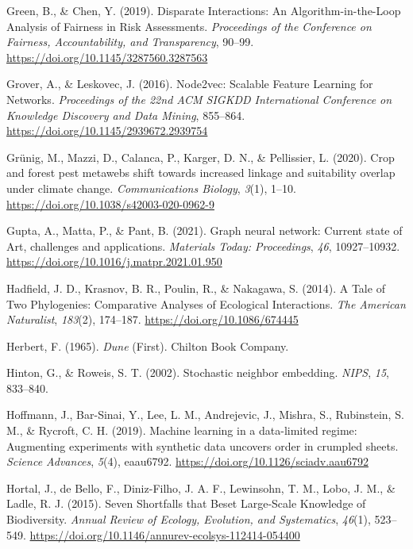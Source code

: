 \documentclass[10pt,oneside]{article}
\newlength{\cslhangindent}
\newenvironment{CSLReferences}[2] %
 {%
  \setlength{\parindent}{0pt}
  \ifodd #1 \everypar{\setlength{\hangindent}{\cslhangindent}}\ignorespaces\fi
  \ifnum #2 > 0
  \setlength{\parskip}{#2\baselineskip}
  \fi
 }%
 {}
\begin{document}
\begin{CSLReferences}{1}{0}
\leavevmode{}%
Green, B., \& Chen, Y. (2019). Disparate Interactions: An
Algorithm-in-the-Loop Analysis of Fairness in Risk Assessments.
\emph{Proceedings of the Conference on Fairness, Accountability, and
Transparency}, 90--99. \url{https://doi.org/10.1145/3287560.3287563}

\leavevmode{}%
Grover, A., \& Leskovec, J. (2016). Node2vec: Scalable Feature Learning
for Networks. \emph{Proceedings of the 22nd ACM SIGKDD International
Conference on Knowledge Discovery and Data Mining}, 855--864.
\url{https://doi.org/10.1145/2939672.2939754}

\leavevmode{}%
Grünig, M., Mazzi, D., Calanca, P., Karger, D. N., \& Pellissier, L.
(2020). Crop and forest pest metawebs shift towards increased linkage
and suitability overlap under climate change. \emph{Communications
Biology}, \emph{3}(1), 1--10.
\url{https://doi.org/10.1038/s42003-020-0962-9}

\leavevmode{}%
Gupta, A., Matta, P., \& Pant, B. (2021). Graph neural network: Current
state of Art, challenges and applications. \emph{Materials Today:
Proceedings}, \emph{46}, 10927--10932.
\url{https://doi.org/10.1016/j.matpr.2021.01.950}

\leavevmode{}%
Hadfield, J. D., Krasnov, B. R., Poulin, R., \& Nakagawa, S. (2014). A
Tale of Two Phylogenies: Comparative Analyses of Ecological
Interactions. \emph{The American Naturalist}, \emph{183}(2), 174--187.
\url{https://doi.org/10.1086/674445}

\leavevmode{}%
Herbert, F. (1965). \emph{Dune} (First). Chilton Book Company.

\leavevmode{}%
Hinton, G., \& Roweis, S. T. (2002). Stochastic neighbor embedding.
\emph{NIPS}, \emph{15}, 833--840.

\leavevmode{}%
Hoffmann, J., Bar-Sinai, Y., Lee, L. M., Andrejevic, J., Mishra, S.,
Rubinstein, S. M., \& Rycroft, C. H. (2019). Machine learning in a
data-limited regime: Augmenting experiments with synthetic data uncovers
order in crumpled sheets. \emph{Science Advances}, \emph{5}(4),
eaau6792. \url{https://doi.org/10.1126/sciadv.aau6792}

\leavevmode{}%
Hortal, J., de Bello, F., Diniz-Filho, J. A. F., Lewinsohn, T. M., Lobo,
J. M., \& Ladle, R. J. (2015). Seven Shortfalls that Beset Large-Scale
Knowledge of Biodiversity. \emph{Annual Review of Ecology, Evolution,
and Systematics}, \emph{46}(1), 523--549.
\url{https://doi.org/10.1146/annurev-ecolsys-112414-054400}


\end{CSLReferences}
\end{document}
